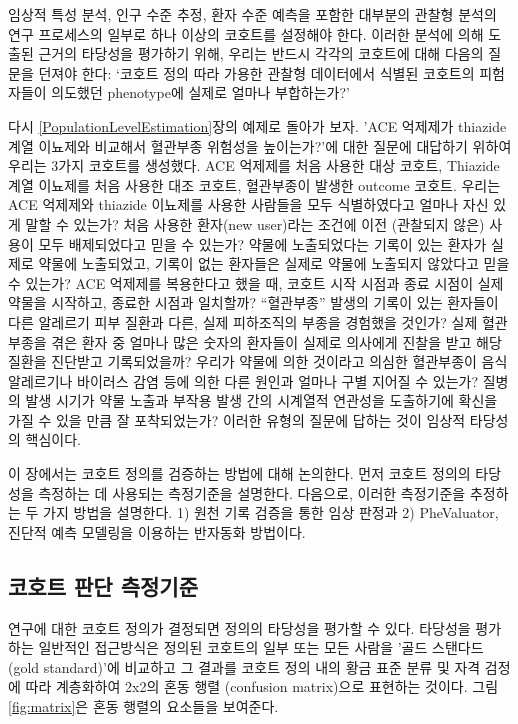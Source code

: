 \documentclass[11pt]{book}
\theoremstyle{definition}
\theoremstyle{definition}
\theoremstyle{definition}
\theoremstyle{remark}
\begin{document}
임상적 특성 분석, 인구 수준 추정, 환자 수준 예측을 포함한 대부분의
관찰형 분석의 연구 프로세스의 일부로 하나 이상의 코호트를 설정해야 한다.
이러한 분석에 의해 도출된 근거의 타당성을 평가하기 위해, 우리는 반드시
각각의 코호트에 대해 다음의 질문을 던져야 한다: `코호트 정의 따라 가용한
관찰형 데이터에서 식별된 코호트의 피험자들이 의도했던 phenotype에 실제로
얼마나 부합하는가?'

다시 \ref{PopulationLevelEstimation}장의 예제로 돌아가 보자. 'ACE
억제제가 thiazide 계열 이뇨제와 비교해서 혈관부종 위험성을 높이는가?'에
대한 질문에 대답하기 위하여 우리는 3가지 코호트를 생성했다. ACE 억제제를
처음 사용한 대상 코호트, Thiazide 계열 이뇨제를 처음 사용한 대조 코호트,
혈관부종이 발생한 outcome 코호트. 우리는 ACE 억제제와 thiazide 이뇨제를
사용한 사람들을 모두 식별하였다고 얼마나 자신 있게 말할 수 있는가? 처음
사용한 환자(new user)라는 조건에 이전 (관찰되지 않은) 사용이 모두
배제되었다고 믿을 수 있는가? 약물에 노출되었다는 기록이 있는 환자가
실제로 약물에 노출되었고, 기록이 없는 환자들은 실제로 약물에 노출되지
않았다고 믿을 수 있는가? ACE 억제제를 복용한다고 했을 때, 코호트 시작
시점과 종료 시점이 실제 약물을 시작하고, 종료한 시점과 일치할까?
``혈관부종'' 발생의 기록이 있는 환자들이 다른 알레르기 피부 질환과 다른,
실제 피하조직의 부종을 경험했을 것인가? 실제 혈관 부종을 겪은 환자 중
얼마나 많은 숫자의 환자들이 실제로 의사에게 진찰을 받고 해당 질환을
진단받고 기록되었을까? 우리가 약물에 의한 것이라고 의심한 혈관부종이
음식 알레르기나 바이러스 감염 등에 의한 다른 원인과 얼마나 구별 지어질
수 있는가? 질병의 발생 시기가 약물 노출과 부작용 발생 간의 시계열적
연관성을 도출하기에 확신을 가질 수 있을 만큼 잘 포착되었는가? 이러한
유형의 질문에 답하는 것이 임상적 타당성의 핵심이다.

이 장에서는 코호트 정의를 검증하는 방법에 대해 논의한다. 먼저 코호트
정의의 타당성을 측정하는 데 사용되는 측정기준을 설명한다. 다음으로,
이러한 측정기준을 추정하는 두 가지 방법을 설명한다. 1) 원천 기록 검증을
통한 임상 판정과 2) PheValuator, 진단적 예측 모델링을 이용하는 반자동화
방법이다.

\subsection{코호트 판단 측정기준}\label{--}

연구에 대한 코호트 정의가 결정되면 정의의 타당성을 평가할 수 있다.
타당성을 평가하는 일반적인 접근방식은 정의된 코호트의 일부 또는 모든
사람을 '골드 스탠다드(gold standard)'에 비교하고 그 결과를 코호트 정의
내의 황금 표준 분류 및 자격 검정에 따라 계층화하여 2x2의 혼동 행렬
(confusion matrix)으로 표현하는 것이다. 그림 \ref{fig:matrix}은 혼동
행렬의 요소들을 보여준다.
\end{document}
